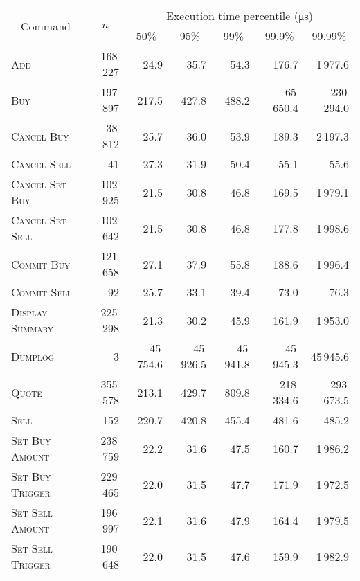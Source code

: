 \begin{tabular}{lrrrrrr}
\toprule
\multicolumn{1}{c}{\multirow{2}{*}{Command}} & \multicolumn{1}{c}{\multirow{2}{*}{$n$}} & \multicolumn{5}{c}{Execution time percentile (\si{\micro\second})} \\
\multicolumn{1}{c}{} & \multicolumn{1}{c}{} & \multicolumn{1}{c}{50\%} & \multicolumn{1}{c}{95\%} & \multicolumn{1}{c}{99\%} & \multicolumn{1}{c}{99.9\%} & \multicolumn{1}{c}{99.99\%}\\
\midrule

\textsc{Add}              & 168\,227 & 24.9      & 35.7      & 54.3      & 176.7      & 1\,977.6   \\
\textsc{Buy}              & 197\,897 & 217.5     & 427.8     & 488.2     & 65\,650.4  & 230\,294.0 \\
\textsc{Cancel Buy}       & 38\,812  & 25.7      & 36.0      & 53.9      & 189.3      & 2\,197.3   \\
\textsc{Cancel Sell}      & 41       & 27.3      & 31.9      & 50.4      & 55.1       & 55.6     \\
\textsc{Cancel Set Buy}   & 102\,925 & 21.5      & 30.8      & 46.8      & 169.5      & 1\,979.1   \\
\textsc{Cancel Set Sell}  & 102\,642 & 21.5      & 30.8      & 46.8      & 177.8      & 1\,998.6   \\
\textsc{Commit Buy}       & 121\,658 & 27.1      & 37.9      & 55.8      & 188.6      & 1\,996.4   \\
\textsc{Commit Sell}      & 92       & 25.7      & 33.1      & 39.4      & 73.0       & 76.3     \\
\textsc{Display Summary}  & 225\,298 & 21.3      & 30.2      & 45.9      & 161.9      & 1\,953.0   \\
\textsc{Dumplog}          & 3        & 45\,754.6 & 45\,926.5 & 45\,941.8 & 45\,945.3  & 45\,945.6  \\
\textsc{Quote}            & 355\,578 & 213.1     & 429.7     & 809.8     & 218\,334.6 & 293\,673.5 \\
\textsc{Sell}             & 152      & 220.7     & 420.8     & 455.4     & 481.6      & 485.2    \\
\textsc{Set Buy Amount}   & 238\,759 & 22.2      & 31.6      & 47.5      & 160.7      & 1\,986.2   \\
\textsc{Set Buy Trigger}  & 229\,465 & 22.0      & 31.5      & 47.7      & 171.9      & 1\,972.5   \\
\textsc{Set Sell Amount}  & 196\,997 & 22.1      & 31.6      & 47.9      & 164.4      & 1\,979.5   \\
\textsc{Set Sell Trigger} & 190\,648 & 22.0      & 31.5      & 47.6      & 159.9      & 1\,982.9   \\

\bottomrule
\end{tabular}
